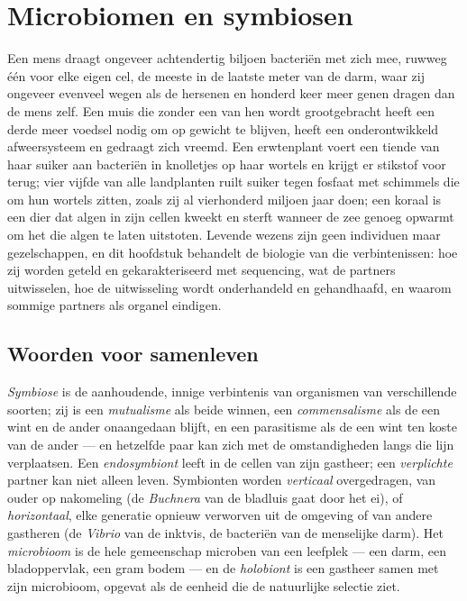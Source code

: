 \chapter{Microbiomen en symbiosen}\label{ch:b3:microbiomes}

Een mens draagt ongeveer achtendertig biljoen bacteriën met zich mee,
ruwweg één voor elke eigen cel, de meeste in de laatste meter van de
darm, waar zij ongeveer evenveel wegen als de hersenen en honderd keer
meer genen dragen dan de mens zelf. Een muis die zonder een van hen
wordt grootgebracht heeft een derde meer voedsel nodig om op gewicht
te blijven, heeft een onderontwikkeld afweersysteem en gedraagt zich
vreemd. Een erwtenplant voert een tiende van haar suiker aan bacteriën
in knolletjes op haar wortels en krijgt er stikstof voor terug; vier
vijfde van alle landplanten ruilt suiker tegen fosfaat met schimmels
die om hun wortels zitten, zoals zij al vierhonderd miljoen jaar doen;
een koraal is een dier dat algen in zijn cellen kweekt en sterft
wanneer de zee genoeg opwarmt om het die algen te laten uitstoten.
Levende wezens zijn geen individuen maar gezelschappen, en dit
hoofdstuk behandelt de biologie van die verbintenissen: hoe zij worden
geteld en gekarakteriseerd met sequencing, wat de partners uitwisselen,
hoe de uitwisseling wordt onderhandeld en gehandhaafd, en waarom
sommige partners als organel eindigen.

\section{Woorden voor samenleven}

\begin{definition}[Symbiose]\label{def:b3:microbiomes:symbiosis}
\emph{Symbiose} is de aanhoudende, innige verbintenis van organismen
van verschillende soorten; zij is een \emph{mutualisme} als beide
winnen, een \emph{commensalisme} als de een wint en de ander
onaangedaan blijft, en een parasitisme als de een wint ten koste van de
ander --- en hetzelfde paar kan zich met de omstandigheden langs die
lijn verplaatsen. Een \emph{endosymbiont} leeft in de cellen van zijn
gastheer; een \emph{verplichte} partner kan niet alleen leven.
Symbionten worden \emph{verticaal} overgedragen, van ouder op
nakomeling (de \emph{Buchnera} van de bladluis gaat door het ei), of
\emph{horizontaal}, elke generatie opnieuw verworven uit de omgeving of
van andere gastheren (de \emph{Vibrio} van de inktvis, de bacteriën van
de menselijke darm). Het \emph{microbioom} is de hele gemeenschap
microben van een leefplek --- een darm, een bladoppervlak, een gram
bodem --- en de \emph{holobiont} is een gastheer samen met zijn
microbioom, opgevat als de eenheid die de natuurlijke selectie ziet.
\end{definition}

